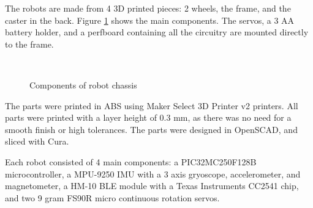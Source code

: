 \documentclass[]{article}
\begin{document}
The robots are made from 4 3D printed pieces: 2 wheels, the frame, and
the caster in the back.
Figure \ref{fig:robotchassis} shows the main components.
The servos, a 3 AA battery holder, and a perfboard containing all the circuitry are mounted directly to the frame.

\begin{figure}
  \centering
  \\
  \caption{Components of robot chassis}
  \label{fig:robotchassis}
\end{figure}

The parts were printed in ABS using Maker Select 3D Printer v2 printers.
All parts were printed with a layer height of 0.3 mm, as there was no need for a smooth finish or high tolerances.
The parts were designed in OpenSCAD, and sliced with Cura.

Each robot consisted of 4 main components: a PIC32MC250F128B microcontroller, a MPU-9250 IMU with a 3 axis gryoscope, accelerometer, and magnetometer, a HM-10 BLE module with a Texas Instruments CC2541 chip, and two 9 gram FS90R micro continuous rotation servos.
\end{document}
